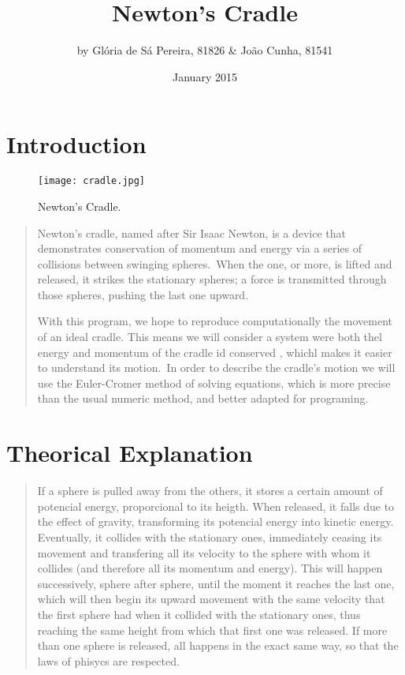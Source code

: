 \documentclass{article}
\title{Newton's Cradle}
\author{by Gl\'oria de S\'a Pereira, 81826 \& Jo\~ao Cunha, 81541}
\date{January 2015}
\begin{document}
\maketitle
\noindent\hrulefill
\section{Introduction}
\begin{figure}[hb]
  \centering
  \texttt{[image: cradle.jpg]}
  \caption[Newton's Cradle]
    {Newton's Cradle.}
\end{figure}
\begin{quote}
Newton's cradle, named after Sir Isaac Newton, is a device that demonstrates conservation of momentum and energy via a series of collisions between swinging spheres.\ When the one, or more,  is lifted and released, it strikes the stationary spheres; a force is transmitted through those spheres, pushing the last one upward.

With this program, we hope to reproduce computationally the movement of an ideal cradle. This means we will consider a system were both thel energy and momentum of the cradle id conserved , whichl makes it easier to understand its motion.\ In order to describe the cradle's motion we will use the Euler-Cromer method of solving equations, which is more precise than the usual numeric method, and better adapted for programing.
\end{quote}
\noindent\hrulefill
\section{Theorical Explanation}
\begin{quote}
If a sphere is pulled away from the others, it stores a certain amount of potencial energy, proporcional to its heigth. When released, it falls due to the effect of gravity, transforming its potencial energy into kinetic energy. Eventually, it collides with the stationary ones, immediately ceasing its movement and transfering all its velocity to the sphere with whom it collides (and therefore all its momentum and energy). This will happen successively, sphere after sphere, until the moment it reaches the last one, which will then begin its upward movement with the same velocity that the first sphere had when it collided with the stationary ones, thus reaching the same height from which that first one was released. If more than one sphere is released, all happens in the exact same way, so that the laws of phisycs are respected. 
\end{quote}
\noindent\hrulefill
\end{document}
